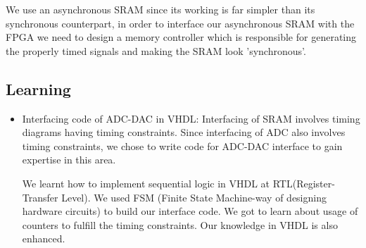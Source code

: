 \documentclass[../../main.tex]{subfiles}
\begin{document}
We use an asynchronous SRAM since its working is far simpler than its synchronous counterpart, in order to interface our asynchronous SRAM with the FPGA we need to design a memory controller which is responsible for generating the properly timed signals and making the SRAM look ’synchronous’.\\


\subsection{Learning}
\begin{itemize}
    \item Interfacing code of ADC-DAC in VHDL: Interfacing of SRAM involves timing diagrams having timing constraints. Since interfacing of ADC also involves timing constraints, we chose to write code for ADC-DAC interface to gain expertise in this area.
    
    We learnt how to implement sequential logic in VHDL at RTL(Register-Transfer Level). We used FSM (Finite State Machine-way of designing hardware circuits) to build our interface code. We got to learn about usage of counters to fulfill the timing constraints. Our knowledge in VHDL is also enhanced.\\ 
\end{itemize}
\end{document}
